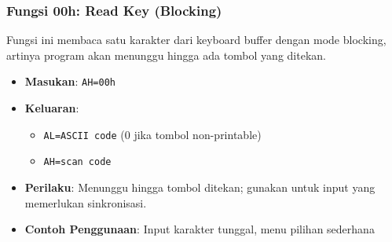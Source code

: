 \documentclass[../main.tex]{subfiles}
\begin{document}
\subsubsection{Fungsi 00h: Read Key (Blocking)}
Fungsi ini membaca satu karakter dari keyboard buffer dengan mode blocking, artinya program akan menunggu hingga ada tombol yang ditekan.

\begin{itemize}
    \item \textbf{Masukan}: \texttt{AH=00h}
    \item \textbf{Keluaran}: 
        \begin{itemize}
            \item \texttt{AL=ASCII code} (0 jika tombol non-printable)
            \item \texttt{AH=scan code}
        \end{itemize}
    \item \textbf{Perilaku}: Menunggu hingga tombol ditekan; gunakan untuk input yang memerlukan sinkronisasi.
    \item \textbf{Contoh Penggunaan}: Input karakter tunggal, menu pilihan sederhana
\end{itemize}
\end{document}
